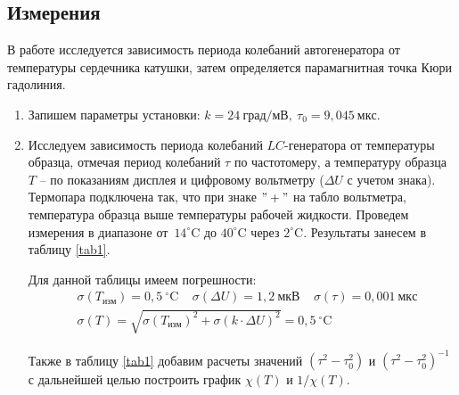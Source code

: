 \documentclass{lab}
\newcommand{\Cd}{^{\circ}\mathrm{C}}
\begin{document}
\subsection*{Измерения}
\hspace*{\parindent}
В работе исследуется зависимость периода колебаний автогенератора от температуры сердечника
катушки, затем определяется парамагнитная точка Кюри гадолиния.

\begin{enumerate}
\item
Запишем параметры установки: $ k = 24 ~ град/мВ, ~ \tau_0 = 9,045 ~ мкс $.

\item
Исследуем зависимость периода колебаний $ LC $-генератора от температуры образца, отмечая
период колебаний $ \tau $ по частотомеру, а температуру образца $ T $ -- по показаниям дисплея и
цифровому вольтметру ($ \Delta U $ с учетом знака). Термопара подключена так, что при знаке
$ "+" $ на табло вольтметра, температура образца выше температуры рабочей жидкости. Проведем
измерения в диапазоне от~$ 14 \Cd $ до $ 40 \Cd $ через $ 2 \Cd $. Результаты занесем в таблицу
\ref{tab1}.

Для данной таблицы имеем погрешности:
\begin{equation}
\begin{aligned}
&\sigma(T_{изм}) = 0,5~\Cd ~~~~~ \sigma(\Delta U) = 1,2~мкВ ~~~~~ \sigma(\tau) = 0,001~мкс	\\
&\sigma(T) = \sqrt{\sigma(T_{изм})^2 + \sigma(k \cdot \Delta U)^2} = 0,5~\Cd
\end{aligned}
\end{equation}

\newpage

Также в таблицу \ref{tab1} добавим расчеты значений $ (\tau^2 - \tau_0^2) $ и
$ (\tau^2 - \tau_0^2)^{-1} $ с дальнейшей целью построить график $ \chi(T) $ и $ 1/\chi(T) $.


\end{enumerate}
\end{document}
